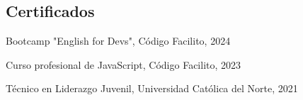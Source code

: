 \begin{CVsidebar}
    \LngTextCEFR
    
    \LngTextILR
    
    
    
    \dotline
    
    
    
    \section{Certificados}
    \begin{itemlist}
        \item Bootcamp "English for Devs", Código Facilito, 2024
        \item Curso profesional de JavaScript, Código Facilito, 2023
        \item Técnico en Liderazgo Juvenil, Universidad Católica del Norte, 2021
    \end{itemlist}
    
    
    
    
    
    
    \end{CVsidebar}